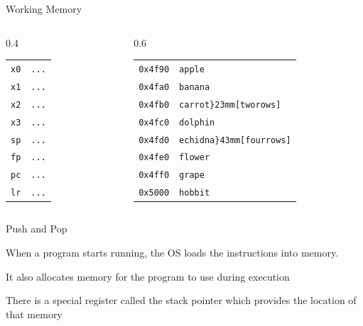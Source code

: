 \begin{frame}{Working Memory}
	\begin{columns}
		\begin{column}{0.4\textwidth}
			\begin{alltt}
				\begin{tabular}{ r | l }
					x0 & ... \\
					x1 & ... \\
					x2 & ... \\
					x3 & ... \\
					sp & ... \\
					fp & ... \\
					pc & ... \\
					lr & ... \\
				\end{tabular}
			\end{alltt}
		\end{column}
		\begin{column}{0.6\textwidth}
			\begin{alltt}
				\begin{tabular}{ r | l }
					0x4f90 & apple \\
					0x4fa0 & banana \\
					0x4fb0 & carrot \rdelim\}{2}{3mm}[two rows] \\
					0x4fc0 & dolphin \\
					0x4fd0 & echidna \rdelim\}{4}{3mm}[four rows] \\
					0x4fe0 & flower \\
					0x4ff0 & grape \\
					0x5000 & hobbit \\
				\end{tabular}
			\end{alltt}
		\end{column}
	\end{columns}

\end{frame}









\begin{frame}{Push and Pop}

	When a program starts running, the OS loads the instructions into memory.

	It also allocates memory for the program to use during execution

	There is a special register called the stack pointer which provides the location of that memory

\end{frame}


